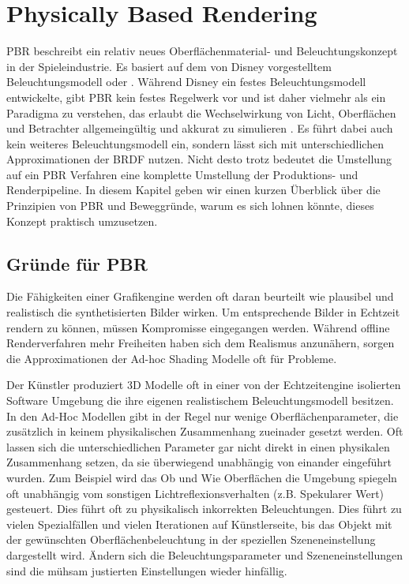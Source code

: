 \chapter{Physically Based Rendering}
\label{chap:pbr}

\acl{PBR} beschreibt ein relativ neues Oberflächenmaterial- und Beleuchtungskonzept in der Spieleindustrie. Es basiert auf dem von Disney vorgestelltem Beleuchtungsmodell \parencite{Burley2012} oder \parencite{Gotanda}. Während Disney ein festes Beleuchtungsmodell entwickelte, gibt \ac{PBR} kein festes Regelwerk vor und ist daher vielmehr als ein Paradigma zu verstehen, das erlaubt die Wechselwirkung von Licht, Oberflächen und Betrachter allgemeingültig und akkurat zu simulieren \parencite[Kapitel 1]{Rousiers2014}. Es führt dabei auch kein weiteres Beleuchtungsmodell ein, sondern lässt sich mit unterschiedlichen Approximationen der BRDF nutzen. Nicht desto trotz bedeutet die Umstellung auf ein \ac{PBR} Verfahren eine komplette Umstellung der Produktions- und Renderpipeline. In diesem Kapitel geben wir einen kurzen Überblick über die Prinzipien von \ac{PBR} und Beweggründe, warum es sich lohnen könnte, dieses Konzept praktisch umzusetzen.

\section{Gründe für \acl{PBR}}
\label{sec:pbr-warum}

Die Fähigkeiten einer Grafikengine werden oft daran beurteilt wie plausibel und realistisch die synthetisierten Bilder wirken. Um entsprechende Bilder in Echtzeit rendern zu können, müssen Kompromisse eingegangen werden. Während offline Renderverfahren mehr Freiheiten haben sich dem Realismus anzunähern, sorgen die Approximationen der Ad-hoc Shading Modelle \parencite{Martinez2010} oft für Probleme.

Der Künstler produziert 3D Modelle oft in einer von der Echtzeitengine isolierten Software Umgebung die ihre eigenen realistischem Beleuchtungsmodell besitzen. In den Ad-Hoc Modellen  gibt in der Regel nur wenige Oberflächenparameter, die zusätzlich in keinem physikalischen Zusammenhang zueinader gesetzt werden. Oft lassen sich die unterschiedlichen Parameter gar nicht direkt in einen physikalen Zusammenhang setzen, da sie überwiegend unabhängig von einander eingeführt wurden. Zum Beispiel wird das Ob und Wie Oberflächen die Umgebung spiegeln oft unabhängig vom sonstigen Lichtreflexionsverhalten (z.B. Spekularer Wert) gesteuert. Dies führt oft zu physikalisch inkorrekten Beleuchtungen. Dies führt zu vielen Spezialfällen und vielen Iterationen auf Künstlerseite, bis das Objekt mit der gewünschten Oberflächenbeleuchtung in der speziellen Szeneneinstellung dargestellt wird. Ändern sich die Beleuchtungsparameter und Szeneneinstellungen sind die mühsam justierten Einstellungen wieder hinfällig. 

